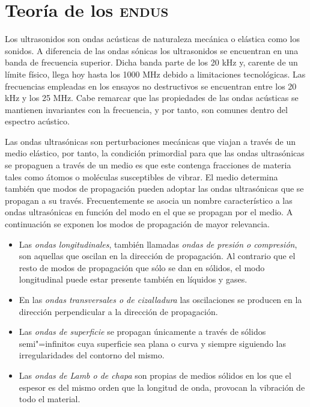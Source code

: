 \chapter{Teoría de los \textsc{endus}}\label{chap:endus}

Los ultrasonidos son ondas acústicas de naturaleza mecánica o elástica como
los sonidos. A diferencia de las ondas sónicas los ultrasonidos se
encuentran en una banda de frecuencia superior. Dicha banda parte de los 20
kHz y, carente de un límite físico, llega hoy hasta los 1000 MHz debido a
limitaciones tecnológicas. Las frecuencias empleadas en los ensayos no
destructivos se encuentran entre los 20 kHz y los 25 MHz. Cabe remarcar que
las propiedades de las ondas acústicas se mantienen invariantes con la
frecuencia, y por tanto, son comunes dentro del espectro acústico.

Las ondas ultrasónicas son perturbaciones mecánicas que viajan a través de
un medio elástico, por tanto, la condición primordial para que las ondas
ultrasónicas se propaguen a través de un medio es que este contenga
fracciones de materia tales como átomos o moléculas susceptibles de vibrar.
El medio determina también que modos de propagación pueden adoptar las
ondas ultrasónicas que se propagan a su través. Frecuentemente se asocia un
nombre característico a las ondas ultrasónicas en función del modo en el
que se propagan por el medio. A continuación se exponen los modos de
propagación de mayor relevancia.

\begin{itemize}
	\item Las \emph{ondas longitudinales}, también llamadas \emph{ondas
		de presión o compresión}, son aquellas que oscilan en la
		dirección de propagación. Al contrario que el resto de
		modos de propagación que sólo se dan en sólidos, el modo
		longitudinal puede estar presente también en líquidos y
		gases.
	\item En las \emph{ondas transversales o de cizalladura} las
		oscilaciones se producen en la dirección perpendicular a la
		dirección de propagación.
	\item Las \emph{ondas de superficie} se propagan únicamente a
		través de sólidos semi"=infinitos cuya superficie sea plana
		o curva y siempre siguiendo las irregularidades del
		contorno del mismo.
	\item Las \emph{ondas de Lamb o de chapa} son propias de medios
		sólidos en los que el espesor es del mismo orden que la
		longitud de onda, provocan la vibración de todo el
		material.
\end{itemize}

